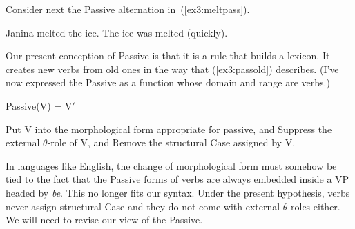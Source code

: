 Consider next the Passive alternation in~(\ref{ex3:meltpass}).
\begin{exe}
	\raggedright
	\ex \label{ex3:meltpass} 
	\begin{xlist}
		\ex Janina melted the ice.
		\ex The ice was melted (quickly).
	\end{xlist}
\end{exe}
Our present conception of Passive is that it is a rule that builds a lexicon. It creates new verbs from old ones in the way that (\ref{ex3:passold}) describes. (I've now expressed the Passive as a function whose domain and range are verbs.)
\begin{exe}
	\raggedright
	\ex \label{ex3:passold} Passive(V) = V$'$
	\begin{xlist}
		\ex Put V into the morphological form appropriate for passive, and
		\ex Suppress the external $\theta$-role of V, and
		\ex Remove the structural Case assigned by V.
	\end{xlist}
\end{exe}
In languages like English, the change of morphological form must somehow be tied to the fact that the Passive forms of verbs are always embedded inside a VP headed by \emph{be}. This no longer fits our syntax. Under the present hypothesis, verbs never assign structural Case and they do not come with external $\theta$-roles either. We will need to revise our view of the Passive.

